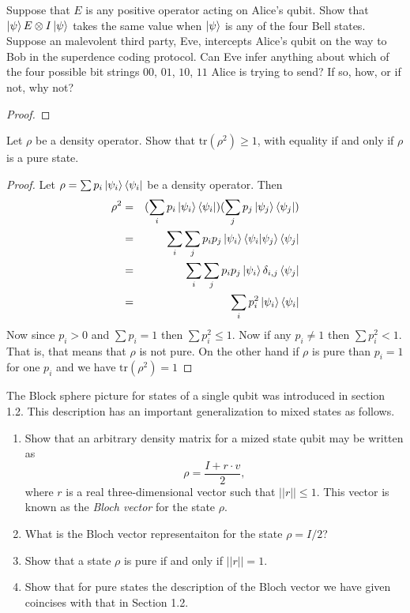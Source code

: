 \documentclass{article}
\begin{document}
\begin{exercise}
  Suppose that $E$ is any positive operator acting on Alice's qubit. Show that $\ket{\psi}E\otimes I\ket{\psi}$ takes the same value when $\ket{\psi}$ is any of the four Bell states. Suppose an malevolent third party, Eve, intercepts Alice's qubit on the way to Bob in the superdence coding protocol. Can Eve infer anything about which of the four possible bit strings $00$, $01$, $10$, $11$ Alice is trying to send? If so, how, or if not, why not?
  \begin{proof}

  \end{proof}
\end{exercise}

\begin{exercise}
  Let $\rho$ be a density operator. Show that $\textrm{tr}(\rho^2)\ge1$, with equality if and only if $\rho$ is a pure state.
  \begin{proof}
    Let $\rho=\sum p_i\ket{\psi_i}\bra{\psi_i}$ be a density operator. Then
    \begin{eqnarray*}
      \rho^2&=&(\sum_i p_i\ket{\psi_i}\bra{\psi_i})(\sum_j p_j\ket{\psi_j}\bra{\psi_j}) \\
      &=&\sum_i\sum_j p_i p_j \ket{\psi_i}\bra{\psi_i}\ket{\psi_j}\bra{\psi_j} \\
      &=&\sum_i\sum_j p_i p_j \ket{\psi_i}\delta_{i,j}\bra{\psi_j} \\
      &=&\sum_i p_i^2 \ket{\psi_i}\bra{\psi_i} \\
    \end{eqnarray*}
    Now since $p_i>0$ and $\sum p_i=1$ then $\sum p_i^2\le 1$. Now if any $p_i\ne1$ then $\sum p_i^2<1$. That is, that means that $\rho$ is not pure. On the other hand if $\rho$ is pure than $p_i=1$ for one $p_i$ and we have $\textrm{tr}(\rho^2)=1$
  \end{proof}
\end{exercise}

\begin{exercise}
  The Block sphere picture for states of a single qubit was introduced in section 1.2. This description has an important generalization to mixed states as follows.
  \begin{enumerate}
    \item Show that an arbitrary density matrix for a mized state qubit may be written as
    \[\rho = \frac{I + r\cdot v}{2},\]
    where $r$ is a real three-dimensional vector such that $||r||\le 1$. This vector is known as the \textit{Bloch vector} for the state $\rho$.
    \item What is the Bloch vector representaiton for the state $\rho=I/2$?
    \item Show that a state $\rho$ is pure if and only if $||r||=1$.
    \item Show that for pure states the description of the Bloch vector we have given coincises with that in Section 1.2.
  \end{enumerate}
\end{exercise}
\end{document}
